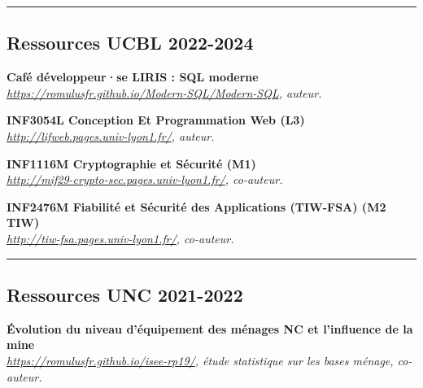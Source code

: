 \documentclass[12pt,a4paper]{article}
\newcommand{\hr}{\textcolor{gris80}{\rule{\linewidth}{0.5pt}}}
\newcommand{\activite}[1]{\textbf{#1}\xspace}
\newcommand{\comment}[1]{\textsl{#1}\xspace}
\begin{document}


\hr
\subsection*{Ressources UCBL 2022-2024}

\activite{Café développeur·se LIRIS : SQL moderne}\\
\comment{\url{https://romulusfr.github.io/Modern-SQL/Modern-SQL}, auteur.}

\activite{INF3054L Conception Et Programmation Web (L3)}\\
\comment{\url{http://lifweb.pages.univ-lyon1.fr/}, auteur.}

\activite{INF1116M Cryptographie et Sécurité (M1)}\\
\comment{\url{http://mif29-crypto-sec.pages.univ-lyon1.fr/}, co-auteur.}

\activite{INF2476M Fiabilité et Sécurité des Applications (TIW-FSA) (M2 TIW)}\\
\comment{\url{http://tiw-fsa.pages.univ-lyon1.fr/}, co-auteur.}



\hr
\subsection*{Ressources UNC 2021-2022}

\activite{Évolution du niveau d'équipement des ménages NC et l'influence de la mine}\\
\comment{\url{https://romulusfr.github.io/isee-rp19/}, étude statistique sur les bases ménage, co-auteur.}
\end{document}
